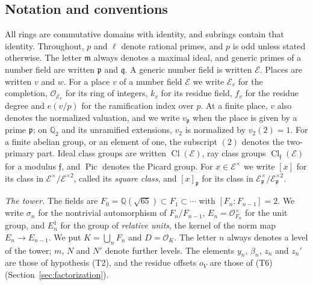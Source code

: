 \documentclass[11pt]{article}
\theoremstyle{plain}
\theoremstyle{definition}
\theoremstyle{remark}
\DeclareMathOperator{\Pic}{Pic}
\DeclareMathOperator{\Cl}{Cl}
\newcommand{\Q}{\mathbb Q}
\newcommand{\OO}{\mathcal O}
\begin{document}
\subsection{Notation and conventions}\label{sec:notation}

All rings are commutative domains with identity, and subrings contain that
identity.  Throughout, $p$ and $\ell$ denote rational primes, and $p$ is
odd unless stated otherwise.  The letter $\mathfrak m$ always denotes a
maximal ideal, and generic primes of a number field are written $\mathfrak
p$ and $\mathfrak q$.  A generic number field is written $\mathcal E$.
Places are written $v$ and $w$.  For a place $v$ of a number field
$\mathcal E$ we write $\mathcal E_v$ for the completion, $\OO_{\mathcal
E_v}$ for its ring of integers, $k_v$ for its residue field, $f_v$ for the residue
degree and $e(v/p)$ for the ramification index over $p$.  At a finite
place, $v$ also denotes the normalized valuation, and we write
$v_{\mathfrak p}$ when the place is given by a prime $\mathfrak p$; on
$\Q_2$ and its unramified extensions, $v_2$ is normalized by $v_2(2)=1$.
For a finite abelian group, or an element of one, the subscript $(2)$
denotes the two-primary part.  Ideal class groups are written
$\Cl(\mathcal E)$, ray class groups $\Cl_{\mathfrak f}(\mathcal E)$ for a
modulus $\mathfrak f$, and $\Pic$ denotes the Picard group.  For
$x\in\mathcal E^\times$ we write $[x]$ for its class in
$\mathcal E^\times/\mathcal E^{\times2}$, called its \emph{square class},
and $[x]_{\mathfrak p}$ for its class in $\mathcal E_{\mathfrak
p}^\times/\mathcal E_{\mathfrak p}^{\times2}$.

\emph{The tower.}  The fields are $F_0=\Q(\sqrt{65})\subset
F_1\subset\cdots$ with $[F_n:F_{n-1}]=2$.  We write $\sigma_n$ for the
nontrivial automorphism of $F_n/F_{n-1}$, $E_n=\OO_{F_n}^\times$ for the
unit group, and $E_n^1$ for the group of \emph{relative units}, the kernel
of the norm map $E_n\to E_{n-1}$.  We put $K=\bigcup_nF_n$ and $D=\OO_K$.
The letter $n$ always denotes a level of the tower; $m$, $N$ and $N'$
denote further levels.  The elements $y_n$, $\beta_n$, $z_n$ and $z_n'$
are those of hypothesis (T2), and the residue offsets $o_V$ are those of
(T6) (Section~\ref{sec:factorization}).
\end{document}

